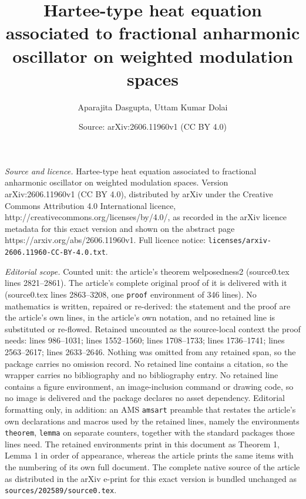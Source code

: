 \documentclass[10pt,a4paper]{amsart}
\title{Hartee-type heat equation associated to fractional anharmonic oscillator on weighted modulation spaces}
\author{Aparajita Dasgupta, Uttam Kumar Dolai}
\date{Source: arXiv:2606.11960v1 (CC BY 4.0)}
\begin{document}
\maketitle

\noindent\emph{Source and licence.} Hartee-type heat equation associated to fractional anharmonic oscillator on weighted modulation spaces. Version arXiv:2606.11960v1 (CC BY 4.0), distributed by arXiv under the Creative Commons Attribution 4.0 International licence, http://creativecommons.org/licenses/by/4.0/, as recorded in the arXiv licence metadata for this exact version and shown on the abstract page https://arxiv.org/abs/2606.11960v1. Full licence notice: \texttt{licenses/arxiv-2606.11960-CC-BY-4.0.txt}.\par\smallskip

\noindent\textit{Editorial scope.} Counted unit: the article's theorem welposedness2 (source0.tex lines 2821--2861). The article's complete original proof of it is delivered with it (source0.tex lines 2863--3208, one \texttt{proof} environment of 346 lines). No mathematics is written, repaired or re-derived: the statement and the proof are the article's own lines, in the article's own notation, and no retained line is substituted or re-flowed.  Retained uncounted as the source-local context the proof needs: lines 986--1031; lines 1552--1560; lines 1708--1733; lines 1736--1741; lines 2563--2617; lines 2633--2646.  Nothing was omitted from any retained span, so the package carries no omission record.  No retained line contains a citation, so the wrapper carries no bibliography and no bibliography entry.  No retained line contains a figure environment, an image-inclusion command or drawing code, so no image is delivered and the package declares no asset dependency.  Editorial formatting only, in addition: an AMS \texttt{amsart} preamble that restates the article's own declarations and macros used by the retained lines, namely the environments \texttt{theorem}, \texttt{lemma} on separate counters, together with the standard packages those lines need.  The retained environments print in this document as Theorem 1, Lemma 1 in order of appearance, whereas the article prints the same items with the numbering of its own full document.  The complete native source of the article as distributed in the arXiv e-print for this exact version is bundled unchanged as \texttt{sources/202589/source0.tex}.
\end{document}
